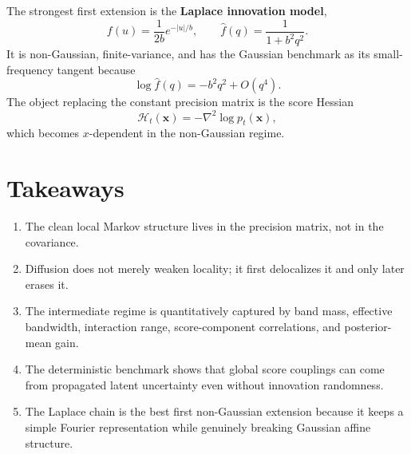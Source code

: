 \documentclass[10pt]{article}
\begin{document}
The strongest first extension is the \textbf{Laplace innovation model},
\begin{equation}
 f(u)=\frac{1}{2b}e^{-|u|/b},
 \qquad \widehat f(q)=\frac{1}{1+b^2q^2}.
\end{equation}
It is non-Gaussian, finite-variance, and has the Gaussian benchmark as its small-frequency tangent because
\begin{equation}
 \log\widehat f(q)=-b^2q^2+O(q^4).
\end{equation}
The object replacing the constant precision matrix is the score Hessian
\begin{equation}
 \mathcal H_t(\mathbf x)=-\nabla^2\log p_t(\mathbf x),
\end{equation}
which becomes $x$-dependent in the non-Gaussian regime.

\section{Takeaways}

\begin{enumerate}[label=(\arabic*),leftmargin=1cm]
\item The clean local Markov structure lives in the precision matrix, not in the covariance.
\item Diffusion does not merely weaken locality; it first delocalizes it and only later erases it.
\item The intermediate regime is quantitatively captured by band mass, effective bandwidth, interaction range, score-component correlations, and posterior-mean gain.
\item The deterministic benchmark shows that global score couplings can come from propagated latent uncertainty even without innovation randomness.
\item The Laplace chain is the best first non-Gaussian extension because it keeps a simple Fourier representation while genuinely breaking Gaussian affine structure.
\end{enumerate}


\end{document}
